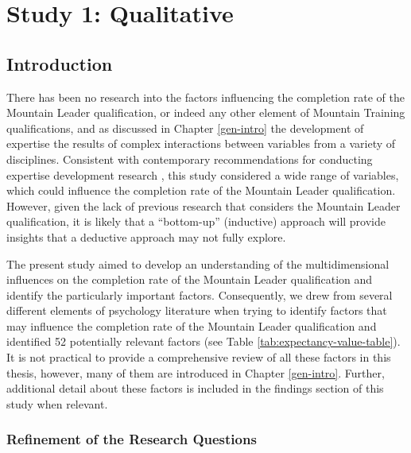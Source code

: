 \documentclass[
  12pt,
  a4paper,
]{book}
\begin{document}
\hypertarget{ml-qualitative}{%
\chapter{Study 1: Qualitative}\label{ml-qualitative}}

\hypertarget{introduction}{%
\section{Introduction}\label{introduction}}

There has been no research into the factors influencing the completion rate of the Mountain Leader qualification, or indeed any other element of Mountain Training qualifications, and as discussed in Chapter \ref{gen-intro} the development of expertise the results of complex interactions between variables from a variety of disciplines. Consistent with contemporary recommendations for conducting expertise development research \citep[e.g.,][]{Gullich2019, Jones2019a, Rees2016}, this study considered a wide range of variables, which could influence the completion rate of the Mountain Leader qualification. However, given the lack of previous research that considers the Mountain Leader qualification, it is likely that a ``bottom-up'' (inductive) approach will provide insights that a deductive approach may not fully explore.

The present study aimed to develop an understanding of the multidimensional influences on the completion rate of the Mountain Leader qualification and identify the particularly important factors. Consequently, we drew from several different elements of psychology literature when trying to identify factors that may influence the completion rate of the Mountain Leader qualification and identified 52 potentially relevant factors (see Table \ref{tab:expectancy-value-table}). It is not practical to provide a comprehensive review of all these factors in this thesis, however, many of them are introduced in Chapter \ref{gen-intro}. Further, additional detail about these factors is included in the findings section of this study when relevant.

\hypertarget{refinement-of-the-research-questions}{%
\subsection{Refinement of the Research Questions}\label{refinement-of-the-research-questions}}
\end{document}

